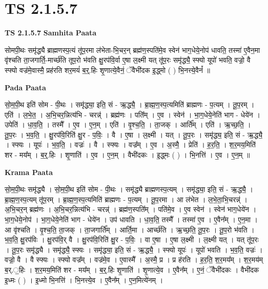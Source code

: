 \documentclass[17pt]{extarticle}
\begin{document}
\section*{ TS 2.1.5.7 }

\textbf{TS 2.1.5.7 } \newline
\textbf{Samhita Paata} \newline

सोमपी॒थः समृ॑द्ध्यै ब्राह्मणस्प॒त्यं तू॑प॒रमा ल॑भेता-भि॒चर॒न् ब्रह्म॑ण॒स्पति॑मे॒व स्वेन॑ भाग॒धेये॒नोप॑ धावति॒ तस्मा॑ ए॒वैन॒मा वृ॑श्चति ता॒जगार्ति॒-मार्च्छ॑ति तूप॒रो भ॑वति क्षु॒रप॑वि॒र्वा ए॒षा ल॒क्ष्मी यत् तू॑प॒रः समृ॑द्ध्यै॒ स्फ्यो यूपो॑ भवति॒ वज्रो॒ वै स्फ्यो वज्र॑मे॒वास्मै॒ प्रह॑रति शर॒मयं॑ ब॒र्॒.हिः शृ॒णात्ये॒वैनं॒ ॅवैभी॑दक इ॒द्ध्मो ( ) भि॒नत्त्ये॒वैनं᳚ ॥ \newline

\textbf{Pada Paata} \newline

सो॒म॒पी॒थ इति॑ सोम - पी॒थः । समृ॑द्ध्या॒ इति॒ सं - ऋ॒द्ध्यै॒ । ब्रा॒ह्म॒ण॒स्प॒त्यमिति॑ ब्राह्मणः - प॒त्यम् । तू॒प॒रम् । एति॑ । ल॒भे॒त॒ । अ॒भि॒चर॒न्नित्य॑भि - चरन्न्॑ । ब्रह्म॑णः । पति᳚म् । ए॒व । स्वेन॑ । भा॒ग॒धेये॒नेति॑ भाग - धेये॑न । उपेति॑ । धा॒व॒ति॒ । तस्मै᳚ । ए॒व । ए॒न॒म् । एति॑ । वृ॒श्च॒ति॒ । ता॒जक् । आर्ति᳚म् । एति॑ । ऋ॒च्छ॒ति॒ । तू॒प॒रः । भ॒व॒ति॒ । क्षु॒रप॑वि॒रिति॑ क्षु॒र - प॒विः॒ । वै । ए॒षा । ल॒क्ष्मी । यत् । तू॒प॒रः । समृ॑द्ध्य॒ इति॒ सं - ऋ॒द्ध्यै॒ । स्फ्यः । यूपः॑ । भ॒व॒ति॒ । वज्रः॑ । वै । स्फ्यः । वज्र᳚म् । ए॒व । अ॒स्मै॒ । प्रेति॑ । ह॒र॒ति॒ । श॒र॒मय॒मिति॑ शर - मय᳚म् । ब॒र्॒.हिः । शृ॒णाति॑ । ए॒व । ए॒न॒म् । वैभी॑दकः । इ॒द्ध्मः ( ) । भि॒नत्ति॑ । ए॒व । ए॒न॒म् ॥  \newline


\textbf{Krama Paata} \newline

सो॒म॒पी॒थः समृ॑द्ध्यै । सो॒म॒पी॒थ इति॑ सोम - पी॒थः । समृ॑द्ध्यै ब्राह्मणस्प॒त्यम् । समृ॑द्ध्या॒ इति॒ सं - ऋ॒द्ध्यै॒ । ब्रा॒ह्म॒ण॒स्प॒त्यम् तू॑प॒रम् । ब्रा॒ह्म॒ण॒स्प॒त्यमिति॑ ब्राह्मणः - प॒त्यम् । तू॒प॒रमा । आ ल॑भेत । ल॒भे॒ता॒भि॒चरन्न्॑ । अ॒भि॒चर॒न् ब्रह्म॑णः । अ॒भि॒चर॒न्नित्य॑भि - चरन्न्॑ । ब्रह्म॑ण॒स्पति᳚म् । पति॑मे॒व । ए॒व स्वेन॑ । स्वेन॑ भाग॒धेये॑न । भा॒ग॒धेये॒नोप॑ । भा॒ग॒धेये॒नेति॑ भाग - धेये॑न । उप॑ धावति । धा॒व॒ति॒ तस्मै᳚ । तस्मा॑ ए॒व । ए॒वैन᳚म् । ए॒न॒मा । आ वृ॑श्चति । वृ॒श्च॒ति॒ ता॒जक् । ता॒जगार्ति᳚म् । आर्ति॒मा । आर्च्छ॑ति । ऋ॒च्छ॒ति॒ तू॒प॒रः । तू॒प॒रो भ॑वति । भ॒व॒ति॒ क्षु॒रप॑विः । क्षु॒रप॑वि॒र् वै । क्षु॒रप॑वि॒रिति॑ क्षु॒र - प॒विः॒ । वा ए॒षा । ए॒षा ल॒क्ष्मी । ल॒क्ष्मी यत् । यत् तू॑प॒रः । तू॒प॒रः समृ॑द्ध्यै । समृ॑द्ध्यै॒ स्फ्यः । समृ॑द्ध्या॒ इति॒ सं - ऋ॒द्ध्यै॒ । स्फ्यो यूपः॑ । यूपो॑ भवति । भ॒व॒ति॒ वज्रः॑ । वज्रो॒ वै । वै स्फ्यः । स्फ्यो वज्र᳚म् । वज्र॑मे॒व । ए॒वास्मै᳚ । अ॒स्मै॒ प्र । प्र ह॑रति । ह॒र॒ति॒ श॒र॒मय᳚म् । श॒र॒मय॑म् ब॒र्.॒हिः । श॒र॒मय॒मिति॑ शर - मय᳚म् । ब॒र्॒.हिः शृ॒णाति॑ । शृ॒णात्ये॒व । ए॒वैन᳚म् । ए॒नं॒ ॅवैभी॑दकः । वैभी॑दक इ॒ध्मः ( ) । इ॒ध्मो भि॒नत्ति॑ । भि॒नत्त्ये॒व । ए॒वैन᳚म् । 
ए॒न॒मित्ये॑नम् । \newline
\end{document}
